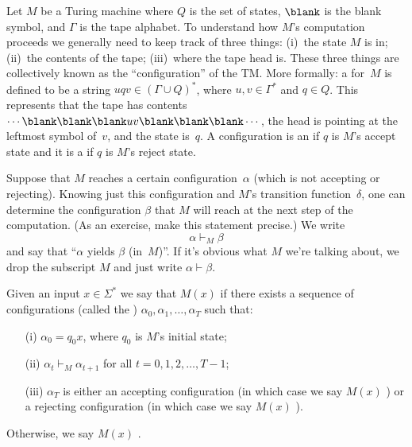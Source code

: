 \begin{definition} \label{definition:A-TM-accepting-or-rejecting-a-string} 
Let $M$ be a Turing machine where $Q$ is the set of states, $\blank$ is the blank symbol, and $\Gamma$ is the tape alphabet. To understand how $M$'s computation proceeds we generally need to keep track of three things: (i)~the state $M$ is in; (ii)~the contents of the tape; (iii)~where the tape head is.  These three things are collectively known as the ``configuration'' of the TM.  More formally: a  for~$M$ is defined to be a string $uqv \in (\Gamma \cup Q)^*$, where $u, v \in \Gamma^*$ and $q \in Q$. This represents that the tape has contents $\cdots \blank \blank \blank uv \blank \blank \blank \cdots$, the head is pointing at the leftmost symbol of~$v$, and the state is~$q$. A configuration is an  if $q$ is $M$'s accept state and it is a  if $q$ is $M$'s reject state.

Suppose that $M$ reaches a certain configuration~$\alpha$ (which is not accepting or rejecting). Knowing just this configuration and $M$'s transition function~$\delta$, one can determine the configuration $\beta$ that $M$ will reach at the next step of the computation. (As an exercise, make this statement precise.)  We write
\[
    \alpha \vdash_M \beta
\]
and say that ``$\alpha$ yields $\beta$ (in~$M$)''.  If it's obvious what $M$ we're talking about, we drop the subscript $M$ and just write $\alpha \vdash \beta$. 

Given an input $x \in \Sigma^*$ we say that $M(x)$  if there exists a sequence of configurations (called the ) $\alpha_0, \alpha_1, \dots, \alpha_{T}$ such that:

\begin{enumerate}
    \item[(i)] $\alpha_0 = q_0x$, where $q_0$ is $M$'s initial state;
    \item[(ii)] $\alpha_t \vdash_M \alpha_{t+1}$ for all $t = 0, 1, 2, \dots, T-1$;
    \item[(iii)] $\alpha_T$ is either an accepting configuration (in which case we say $M(x)$ ) or a rejecting configuration (in which case we say $M(x)$ ).
\end{enumerate}
Otherwise, we say $M(x)$ .
\end{definition}


